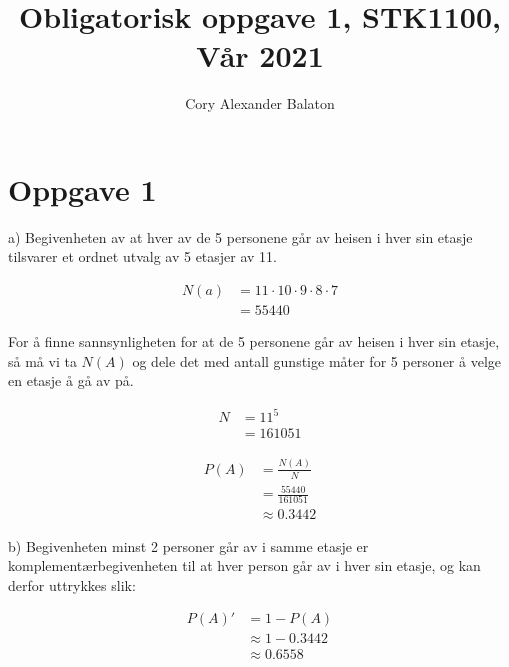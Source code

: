 \documentclass[12pt, a4paper]{article}
\title{Obligatorisk oppgave 1, STK1100, Vår 2021}
\author{Cory Alexander Balaton}
\date{}
\begin{document}
\maketitle 
\newpage

\section*{Oppgave 1}

a) Begivenheten av at hver av de 5 personene går av heisen i hver sin etasje tilsvarer et ordnet utvalg av 5 etasjer av 11.

\begin{equation}
    \begin{split}
        N(a) &= 11 \cdot 10 \cdot 9 \cdot 8 \cdot 7\\
             &= 55440
    \end{split}
\end{equation}

For å finne sannsynligheten for at de 5 personene går av heisen i hver sin etasje, så må vi ta $N(A)$ og dele det med antall gunstige måter for 5 personer
å velge en etasje å gå av på.

\begin{equation}
    \begin{split}
        N &= 11^5 \\
          &= 161051 
    \end{split}
\end{equation}

\begin{equation}
    \begin{split}
        P(A) &= \frac{N(A)}{N} \\
             &= \frac{55440}{161051} \\
             &\approx 0.3442
    \end{split}
\end{equation}

b) Begivenheten minst 2 personer går av i samme etasje er komplementærbegivenheten til at hver person går av i hver sin etasje, og kan derfor uttrykkes slik:

\begin{equation}
    \begin{split}
        P(A)' &= 1 - P(A) \\
              &\approx 1 - 0.3442 \\
              &\approx 0.6558
    \end{split}
\end{equation}
\end{document}
